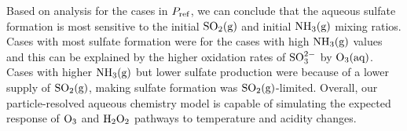 \documentclass[edeposit,fullpage]{uiucthesis2009}
\makeatletter
\DeclareRobustCommand*\unit[1]
 {\ensuremath{%
   {\thinmuskip3mu\relax
    \def\mu{\text{\textmu}}\def~{\,}%
    \ifx\f@series\testbx\mathbf{#1}\else\mathrm{#1}\fi}}}
\makeatother
\begin{document}


Based on analysis for the cases in $P_{\rm ref}$, we can conclude that
the aqueous sulfate formation is most sensitive to the initial $\rm
SO_2(g)$ and initial $\rm NH_3(g)$ mixing ratios. Cases with most
sulfate formation were for the cases with high $\rm NH_3(g)$ values
and this can be explained by the higher oxidation rates of $\rm
SO_3^{2-}$ by $\rm O_3(aq)$. Cases with higher $\rm NH_3(g)$ but lower
sulfate production were because of a lower supply of $\rm SO_2(g)$,
making sulfate formation was $\rm SO_2(g)$-limited. Overall, our
particle-resolved aqueous chemistry model is capable of simulating the
expected response of $\rm O_3$ and $\rm H_2O_2$ pathways to
temperature and acidity changes.
\end{document}
